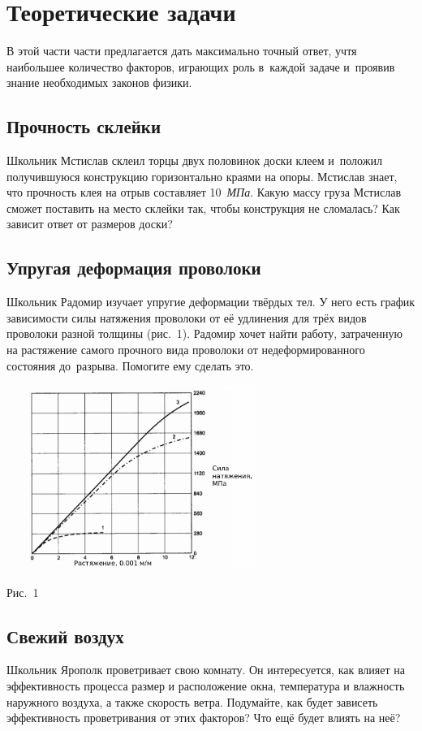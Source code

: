 \documentclass[a4paper,12pt]{article}
\begin{document}
\section{Теоретические задачи}

В этой части части предлагается
дать максимально точный ответ, учтя наибольшее количество факторов, играющих роль в~каждой
задаче и~проявив знание необходимых законов физики.

\subsection{Прочность склейки}
Школьник Мстислав склеил торцы двух половинок доски клеем и~положил получившуюся конструкцию
горизонтально краями на опоры. Мстислав знает, что прочность клея на отрыв составляет 10~\emph{МПа}.
Какую массу груза Мстислав сможет поставить на место склейки так, чтобы конструкция не сломалась?
Как зависит ответ от размеров доски?

\subsection{Упругая деформация проволоки}
Школьник Радомир изучает упругие деформации твёрдых тел. У него есть график зависимости силы
натяжения проволоки от её удлинения для трёх видов проволоки разной толщины (рис.~1).
Радомир хочет найти работу, затраченную на растяжение самого прочного вида проволоки
от недеформированного состояния до~разрыва. Помогите ему сделать это.

\medskip
\centerline{\includegraphics[height=60mm]{tension.png}}
\medskip
\centerline{\small Рис.~1}

\subsection{Свежий воздух}
Школьник Ярополк проветривает свою комнату. Он интересуется, как влияет на эффективность процесса
размер и расположение окна, температура и влажность наружного воздуха, а также скорость ветра.
Подумайте, как будет зависеть эффективность проветривания от этих факторов?
Что ещё будет влиять на неё?
\end{document}
